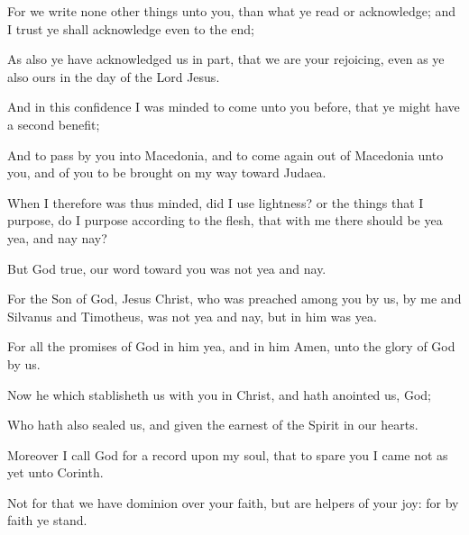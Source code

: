 {For we
write
none other
things unto
you,
than
what ye
read
or
acknowledge;
and I
trust ye shall
acknowledge
even
to the
end;

As
also ye have
acknowledged
us
in
part,
that we
are
your
rejoicing, even
as
ye
also
{}
ours
in the
day of the
Lord
Jesus.


\par }{\PP {}And in
this
confidence I was
minded to
come
unto
you
before,
that ye might
have a
second
benefit;

And to
pass
by
you
into
Macedonia,
and to
come
again out
of
Macedonia
unto
you,
and
of
you to be brought on my
way
toward
Judaea.

When I
therefore
was
thus
minded,
did I
use
lightness?
or the
things that I
purpose, do I
purpose according
to the
flesh,
that
with
me there should
be
yea
yea,
and
nay
nay?

But
{}
God
{}
true,
our
word
toward
you
was
not
yea
and
nay.

For the
Son of
God,
Jesus
Christ,
who was
preached
among
you
by
us,
{}
by
me
and
Silvanus
and
Timotheus,
was
not
yea
and
nay,
but
in
him
was
yea.

For
all the
promises of
God
in
him
{}
yea,
and
in
him
Amen,
unto the
glory of
God
by
us.

Now he
which
stablisheth
us
with
you
in
Christ,
and hath
anointed
us,
{}
God;

Who
hath
also
sealed
us,
and
given the
earnest of the
Spirit
in
our
hearts.

Moreover
I
call
God for a
record
upon
my
soul,
that to
spare
you I
came not as
yet
unto
Corinth.

Not for
that we have
dominion over
your
faith,
but
are
helpers of
your
joy:
for by
faith ye
stand.




\par }
